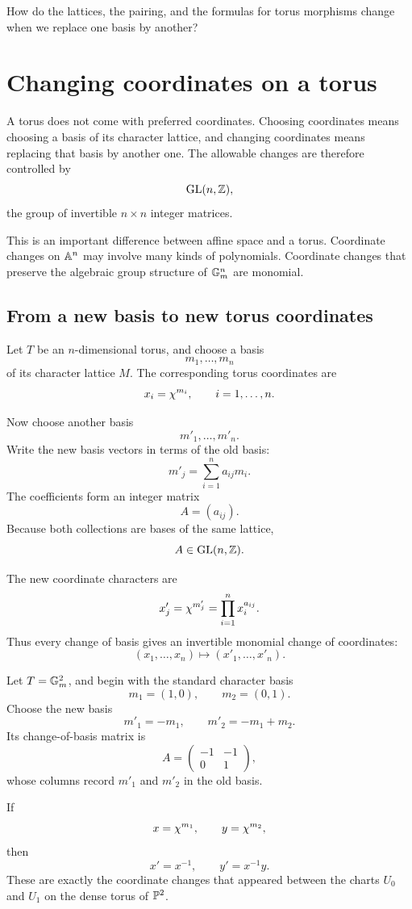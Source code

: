 \begin{guidingquestion}
How do the lattices, the pairing, and the formulas for torus morphisms
change when we replace one basis by another?
\end{guidingquestion}


\section{Changing coordinates on a torus}
\label{sec:changing-torus-coordinates}

A torus does not come with preferred coordinates. Choosing coordinates
means choosing a basis of its character lattice, and changing
coordinates means replacing that basis by another one. The allowable
changes are therefore controlled by
\[
\operatorname{GL}(n,\mathbb{Z}),
\]
the group of invertible \(n\times n\) integer matrices.

This is an important difference between affine space and a torus.
Coordinate changes on \(\mathbb{A}^n\) may involve many kinds of
polynomials. Coordinate changes that preserve the algebraic group
structure of \(\mathbb{G}_{m}^n\) are monomial.

\subsection{From a new basis to new torus coordinates}

Let \(T\) be an \(n\)-dimensional torus, and choose a basis
\[
m_1,\ldots,m_n
\]
of its character lattice \(M\). The corresponding torus coordinates
are
\[
x_i=\chi^{m_i},
\qquad
i=1,\ldots,n.
\]

Now choose another basis
\[
m'_1,\ldots,m'_n.
\]
Write the new basis vectors in terms of the old basis:
\[
m'_j=\sum_{i=1}^n a_{ij}m_i.
\]
The coefficients form an integer matrix
\[
A=(a_{ij}).
\]
Because both collections are bases of the same lattice,
\[
A\in\operatorname{GL}(n,\mathbb{Z}).
\]

The new coordinate characters are
\[
x'_j
=
\chi^{m'_j}
=
\prod_{i=1}^n x_i^{a_{ij}}.
\]
Thus every change of basis gives an invertible monomial change of
coordinates:
\[
(x_1,\ldots,x_n)
\longmapsto
(x'_1,\ldots,x'_n).
\]

\begin{example}
Let \(T=\mathbb{G}_{m}^2\), and begin with the standard character basis
\[
m_1=(1,0),
\qquad
m_2=(0,1).
\]
Choose the new basis
\[
m'_1=-m_1,
\qquad
m'_2=-m_1+m_2.
\]
Its change-of-basis matrix is
\[
A=
\begin{pmatrix}
-1&-1\\
0&1
\end{pmatrix},
\]
whose columns record \(m'_1\) and \(m'_2\) in the old basis.

If
\[
x=\chi^{m_1},
\qquad
y=\chi^{m_2},
\]
then
\[
x'=x^{-1},
\qquad
y'=x^{-1}y.
\]
These are exactly the coordinate changes that appeared between the
charts \(U_0\) and \(U_1\) on the dense torus of \(\mathbb{P}^2\).
\end{example}

